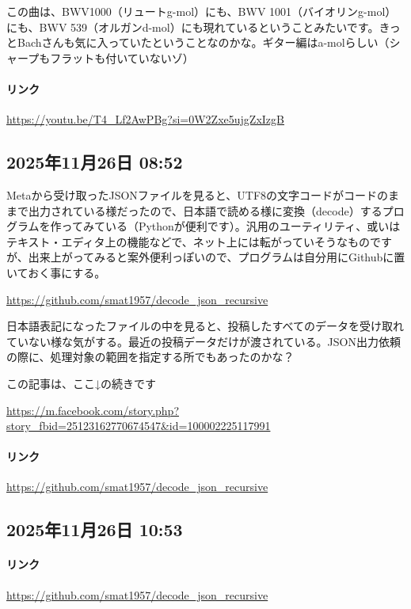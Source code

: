 この曲は、BWV1000（リュートg-mol）にも、BWV 1001（バイオリンg-mol）にも、BWV 539（オルガンd-mol）にも現れているということみたいです。きっとBachさんも気に入っていたということなのかな。ギター編はa-molらしい（シャープもフラットも付いていないゾ）

\paragraph{リンク}
\url{https://youtu.be/T4_Lf2AwPBg?si=0W2Zxe5ujgZxIzgB}

\subsection*{2025年11月26日 08:52}

Metaから受け取ったJSONファイルを見ると、UTF8の文字コードがコードのままで出力されている様だったので、日本語で読める様に変換（decode）するプログラムを作ってみている（Pythonが便利です）。汎用のユーティリティ、或いはテキスト・エディタ上の機能などで、ネット上には転がっていそうなものですが、出来上がってみると案外便利っぽいので、プログラムは自分用にGithubに置いておく事にする。

\url{https://github.com/smat1957/decode_json_recursive}

日本語表記になったファイルの中を見ると、投稿したすべてのデータを受け取れていない様な気がする。最近の投稿データだけが渡されている。JSON出力依頼の際に、処理対象の範囲を指定する所でもあったのかな？

この記事は、ここ↓の続きです

\url{https://m.facebook.com/story.php?story_fbid=25123162770674547&id=100002225117991}

\paragraph{リンク}
\url{https://github.com/smat1957/decode_json_recursive}

\subsection*{2025年11月26日 10:53}

\paragraph{リンク}
\url{https://github.com/smat1957/decode_json_recursive}

